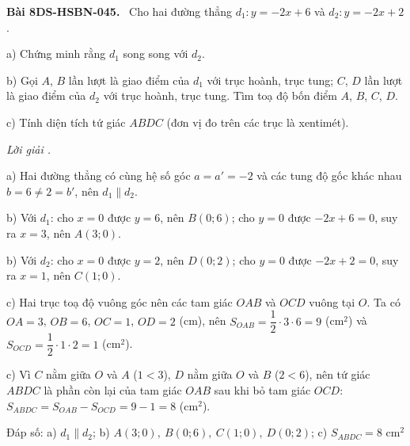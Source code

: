 \documentclass[12pt,a4paper]{article}
\newenvironment{problem}[1][]{\par\medskip\noindent\textbf{Bài #1.}\ }{\par}
\newenvironment{solution}[1][]{\par\noindent\textit{Lời giải #1.}\par}{\par}
\begin{document}
\begin{problem}[8DS-HSBN-045]
Cho hai đường thẳng $d_1\colon y = -2x + 6$ và $d_2\colon y = -2x + 2$.

a) Chứng minh rằng $d_1$ song song với $d_2$.

b) Gọi $A$, $B$ lần lượt là giao điểm của $d_1$ với trục hoành, trục tung; $C$, $D$ lần lượt là giao điểm của $d_2$ với trục hoành, trục tung. Tìm toạ độ bốn điểm $A$, $B$, $C$, $D$.

c) Tính diện tích tứ giác $ABDC$ (đơn vị đo trên các trục là xentimét).

\begin{solution}
a) Hai đường thẳng có cùng hệ số góc $a = a' = -2$ và các tung độ gốc khác nhau $b = 6 \neq 2 = b'$, nên $d_1 \parallel d_2$.

b) Với $d_1$: cho $x = 0$ được $y = 6$, nên $B(0; 6)$; cho $y = 0$ được $-2x + 6 = 0$, suy ra $x = 3$, nên $A(3; 0)$.

b) Với $d_2$: cho $x = 0$ được $y = 2$, nên $D(0; 2)$; cho $y = 0$ được $-2x + 2 = 0$, suy ra $x = 1$, nên $C(1; 0)$.

c) Hai trục toạ độ vuông góc nên các tam giác $OAB$ và $OCD$ vuông tại $O$. Ta có $OA = 3$, $OB = 6$, $OC = 1$, $OD = 2$ (cm), nên $S_{OAB} = \dfrac{1}{2} \cdot 3 \cdot 6 = 9$ (cm$^2$) và $S_{OCD} = \dfrac{1}{2} \cdot 1 \cdot 2 = 1$ (cm$^2$).

c) Vì $C$ nằm giữa $O$ và $A$ ($1 < 3$), $D$ nằm giữa $O$ và $B$ ($2 < 6$), nên tứ giác $ABDC$ là phần còn lại của tam giác $OAB$ sau khi bỏ tam giác $OCD$: $S_{ABDC} = S_{OAB} - S_{OCD} = 9 - 1 = 8$ (cm$^2$).

Đáp số: a) $\boxed{d_1 \parallel d_2}$; b) $\boxed{A(3; 0),\ B(0; 6),\ C(1; 0),\ D(0; 2)}$; c) $\boxed{S_{ABDC} = 8 \text{ cm}^2}$
\end{solution}
\end{problem}
\end{document}
